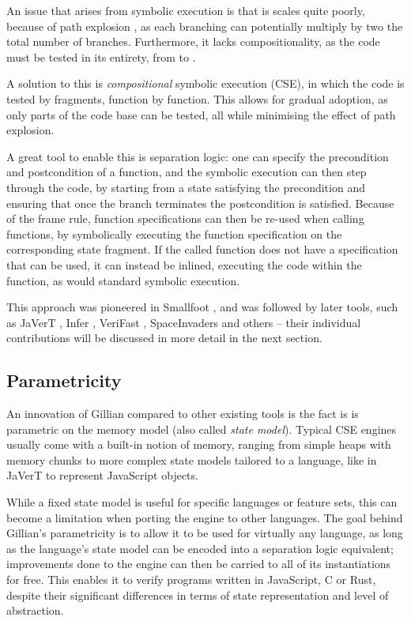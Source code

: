 An issue that arises from symbolic execution is that is scales quite poorly, because of path explosion \cite{pathexplo,surveysymex}, as each branching can potentially multiply by two the total number of branches. Furthermore, it lacks compositionality, as the code must be tested in its entirety, from  to .

A solution to this is \emph{compositional} symbolic execution (CSE), in which the code is tested by fragments, function by function. This allows for gradual adoption, as only parts of the code base can be tested, all while minimising the effect of path explosion.

A great tool to enable this is separation logic: one can specify the precondition and postcondition of a function, and the symbolic execution can then step through the code, by starting from a state satisfying the precondition and ensuring that once the branch terminates the postcondition is satisfied. Because of the frame rule, function specifications can then be re-used when calling functions, by symbolically executing the function specification on the corresponding state fragment. If the called function does not have a specification that can be used, it can instead be inlined, executing the code within the function, as would standard symbolic execution.

This approach was pioneered in Smallfoot \cite{smallfoot}, and was followed by later tools, such as JaVerT \cite{javert1, javert2}, Infer \cite{infer}, VeriFast \cite{verifast}, SpaceInvaders \cite{spaceinvader} and others -- their individual contributions will be discussed in more detail in the next section.

\subsection{Parametricity}

An innovation of Gillian compared to other existing tools is the fact is is parametric on the memory model (also called \emph{state model}). Typical CSE engines usually come with a built-in notion of memory, ranging from simple heaps with memory chunks \cite{verifast} to more complex state models tailored to a language, like in JaVerT \cite{javert1, javert2} to represent JavaScript objects.

While a fixed state model is useful for specific languages or feature sets, this can become a limitation when porting the engine to other languages. The goal behind Gillian's parametricity is to allow it to be used for virtually any language, as long as the language's state model can be encoded into a separation logic equivalent; improvements done to the engine can then be carried to all of its instantiations for free. This enables it to verify programs written in JavaScript, C or Rust, despite their significant differences in terms of state representation and level of abstraction.

